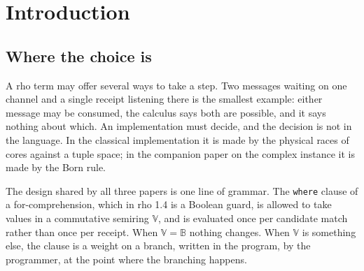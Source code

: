 \documentclass[11pt,a4paper]{article}
\theoremstyle{plain}
\theoremstyle{definition}
\theoremstyle{remark}
\newcommand{\rhoc}{\textsf{rho}}
\newcommand{\V}{\mathbb{V}}
\newcommand{\Bool}{\mathbb{B}}
\begin{document}
\begin{abstract}
The consequences are ecological. The confidence schedule satisfies the
Robbins--Monro conditions for every value of PLN's personality parameter $k$, so
$k$ governs the transient and not the limit --- and only a mortal learner can be
harmed by a transient. We measure the optimum for $k$ across the three
distributions that specify an ecology: over trophic types, over inedibles, and
over token reservoirs housed in no computation. Under expected yield and under
log wealth the optima differ systematically and by a factor of seven at the
baseline, and the two criteria disagree not only about the personality but about
whether learning is worth anything at all. Finally, two learners sharing a
belief namespace exhibit the failure the conservation laws predict: evidence is
not conserved, revision presumes independence, and circulating testimony inflates
the count without adding information. In gradient terms the inflated count is a
collapsed step size, so the pathology of minted confidence is not recklessness
but rigidity.
\end{abstract}

\tableofcontents

\section{Introduction}\label{sec:intro}

\subsection{Where the choice is}

A rho term may offer several ways to take a step. Two messages waiting on one
channel and a single receipt listening there is the smallest example: either
message may be consumed, the calculus says both are possible, and it says nothing
about which. An implementation must decide, and the decision is not in the
language. In the classical implementation it is made by the physical races of
cores against a tuple space; in the companion paper on the complex instance it is
made by the Born rule.

The design shared by all three papers is one line of grammar. The \texttt{where}
clause of a for-comprehension, which in \rhoc{} 1.4 is a Boolean guard, is
allowed to take values in a commutative semiring $\V$, and is evaluated once per
candidate match rather than once per receipt. When $\V = \Bool$ nothing changes.
When $\V$ is something else, the clause is a weight on a branch, written in the
program, by the programmer, at the point where the branching happens.
\end{document}
